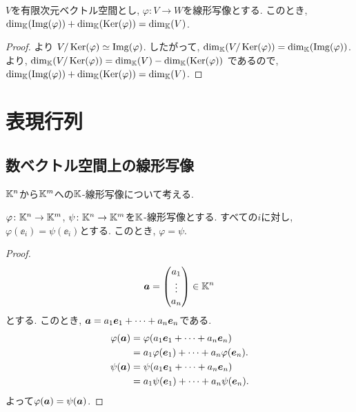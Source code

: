 \begin{cor}
  $V$を有限次元ベクトル空間とし,
  $\varphi\colon V\to W$を線形写像とする.
  このとき,
  $\dim_{\mathbb{K}}(\operatorname{Img}(\varphi))+\dim_{\mathbb{K}}(\operatorname{Ker}(\varphi))=\dim_{\mathbb{K}}(V)$.
\end{cor}
\begin{proof}
  より $V/\operatorname{Ker}(\varphi) \simeq \operatorname{Img}(\varphi)$.
  したがって,
  $\dim_{\mathbb{K}}(V/\operatorname{Ker}(\varphi))=\dim_{\mathbb{K}}(\operatorname{Img}(\varphi))$.
  より,
  $\dim_{\mathbb{K}}(V/\operatorname{Ker}(\varphi))=\dim_{\mathbb{K}}(V)-\dim_{\mathbb{K}}(\operatorname{Ker}(\varphi))$
  であるので,
  $\dim_{\mathbb{K}}(\operatorname{Img}(\varphi))+\dim_{\mathbb{K}}(\operatorname{Ker}(\varphi))=\dim_{\mathbb{K}}(V)$.
\end{proof}


\begin{quiz}
\end{quiz}




\chapter{表現行列}
\section{数ベクトル空間上の線形写像}
$\mathbb{K}^n$から$\mathbb{K}^m$への$\mathbb{K}$-線形写像について考える.
\begin{lemma}
  $\varphi\colon \mathbb{K}^n\to \mathbb{K}^m$,
  $\psi\colon \mathbb{K}^n\to \mathbb{K}^m$を$\mathbb{K}$-線形写像とする.
  すべての$i$に対し, $\varphi(\ee_i)=\psi(\ee_i)$とする.
  このとき,
  $\varphi=\psi$.
\end{lemma}
\begin{proof}
  \begin{align*}
    \boldsymbol{a}=\begin{pmatrix}a_1\\\vdots\\a_n\end{pmatrix}
    \in\mathbb{K}^n
\end{align*}
とする. このとき, $\boldsymbol{a}=a_1\boldsymbol{e}_1+\cdots+a_n\boldsymbol{e}_n$である.
  \begin{align*}
    \varphi(\boldsymbol{a})&=\varphi(a_1\boldsymbol{e}_1+\cdots+a_n\boldsymbol{e}_n)\\
    &=a_1\varphi(\boldsymbol{e}_1)+\cdots+a_n\varphi(\boldsymbol{e}_n).\\
    \psi(\boldsymbol{a})
    &=\psi(a_1\boldsymbol{e}_1+\cdots+a_n\boldsymbol{e}_n)\\
    &=a_1\psi(\boldsymbol{e}_1)+\cdots+a_n\psi(\boldsymbol{e}_n).
  \end{align*}
  よって$\varphi(\boldsymbol{a})=\psi(\boldsymbol{a})$.
\end{proof}

